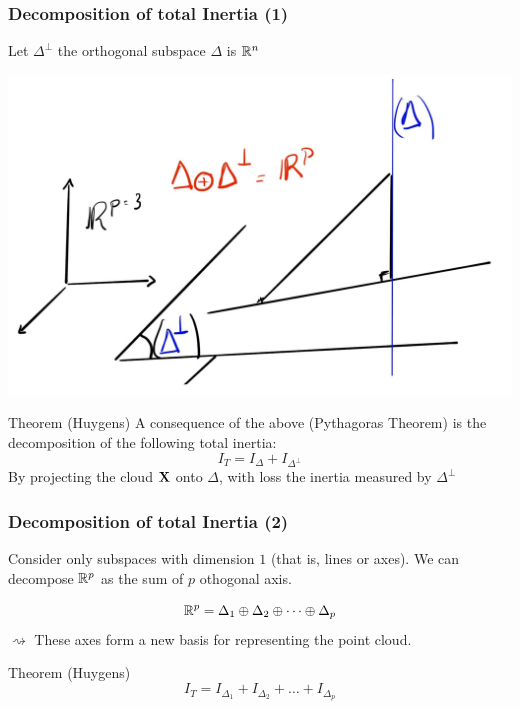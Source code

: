 \documentclass{beamer}\usepackage[]{graphicx}\usepackage[]{color}
\begin{document}
\begin{frame}
  \frametitle{Decomposition of total Inertia (1)}
  
  Let $\Delta^\bot$ the orthogonal subspace $\Delta$  is $\mathbb{R}^n$

  \includegraphics[width=.5\textwidth]{supp_spaces}

  \begin{block}{Theorem (Huygens)}
    A consequence of the above (Pythagoras Theorem) is the decomposition of the following total inertia:
      \begin{equation*}
        I_T = I_{\Delta} + I_{\Delta^\bot}
      \end{equation*}
    \alert{By projecting the cloud $\mathbf{X}$ onto $\Delta$, with loss the inertia measured by $\Delta^\bot$}
    \end{block}
        
\end{frame}

\begin{frame}
  \frametitle{Decomposition of total Inertia (2)}
  
  Consider only subspaces with dimension $1$ (that is, lines or axes). We can decompose $\mathbb{R}^p$ as the sum of $p$ othogonal axis. 
  
  \begin{equation*}
    \mathbb{R}^p = \Delta_1 \oplus \Delta_2 \oplus \dots \oplus \Delta_p
  \end{equation*}
  \alert{$\rightsquigarrow$ These axes form a new basis for representing the point cloud.}

  \begin{block}{Theorem (Huygens)}
    \begin{equation*}
      I_{T} = I_{\Delta_1} + I_{\Delta_2} + \dots + I_{\Delta_p}
    \end{equation*}
  \end{block}
  
\end{frame}

\end{document}
